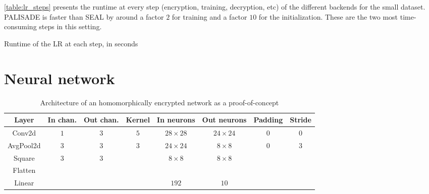 \documentclass[a4paper,11pt,oneside]{report}
\begin{document}
\autoref{table:lr_steps} presents the runtime at every step (encryption, training, decryption, etc) of the different backends for the small dataset.
PALISADE is faster than SEAL by around a factor $2$ for training and a factor $10$ for the initialization. 
These are the two most time-consuming steps in this setting.

\begin{table}[h!]
  \begin{center}
    \caption{Runtime of the LR at each step, in seconds}
    \label{table:lr_steps}
  \end{center}
\end{table}


\section{Neural network}\label{sec:eval_cnn}

\begin{table}[h!]
  \begin{center}
    \caption{Architecture of an homomorphically encrypted network as a proof-of-concept}
    \label{table:poc}
    \begin{tabular}{ c c c c c c c c }
    \hline
    Layer & In chan. & Out chan. & Kernel & In neurons & Out neurons & Padding & Stride \\
    \hline
    Conv2d & $1$ & $3$ & $5$ & $28 \times 28$ & $24 \times 24$ & $0$ & $0$ \\
    AvgPool2d & $3$ & $3$ & $3$ & $24 \times 24$ & $8 \times 8$ & $0$ & $3$ \\
    Square & $3$ & $3$ & & $8 \times 8$ & $8 \times 8$ &  &  \\
    Flatten \\
    Linear & & & & $192$ & $10$ & &  \\
    \hline
    \end{tabular}
  \end{center}
\end{table}
\end{document}
